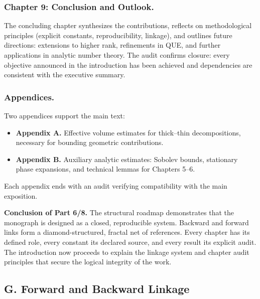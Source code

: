\subsubsection*{Chapter 9: Conclusion and Outlook.}
The concluding chapter synthesizes the contributions,
reflects on methodological principles (explicit constants, reproducibility, linkage),
and outlines future directions:
extensions to higher rank,
refinements in QUE,
and further applications in analytic number theory.
The audit confirms closure: every objective announced in the introduction
has been achieved and dependencies are consistent with the executive summary.

\subsubsection*{Appendices.}
Two appendices support the main text:
\begin{itemize}
  \item \textbf{Appendix A.} Effective volume estimates for thick–thin decompositions,
        necessary for bounding geometric contributions.
  \item \textbf{Appendix B.} Auxiliary analytic estimates:
        Sobolev bounds, stationary phase expansions,
        and technical lemmas for Chapters 5–6.
\end{itemize}
Each appendix ends with an audit verifying compatibility with the main exposition.

\medskip

\noindent\textbf{Conclusion of Part 6/8.}
The structural roadmap demonstrates that the monograph is designed as a closed, reproducible system.
Backward and forward links form a diamond-structured, fractal net of references.
Every chapter has its defined role,
every constant its declared source,
and every result its explicit audit.
The introduction now proceeds to explain the linkage system and chapter audit principles
that secure the logical integrity of the work.


\subsection*{G. Forward and Backward Linkage}

